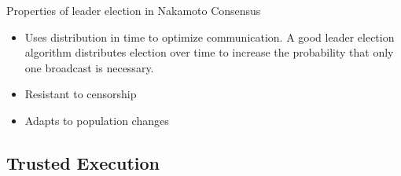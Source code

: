 Properties of leader election in Nakamoto Consensus
\begin{itemize}
\item Uses distribution in time to optimize communication. A good leader
  election algorithm distributes election over time to increase the
  probability that only one broadcast is necessary.
\item Resistant to censorship
\item Adapts to population changes
\end{itemize}

\subsection{Trusted Execution}

